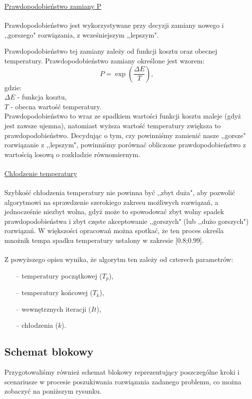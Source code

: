 \documentclass[twoside]{projektInzynierskiMS1}
\newcommand{\newLine}{~\\}
\newcommand{\si}{ś}
\begin{document}
\noindent \underline{Prawdopodobieństwo zamiany P} \\ \newLine
\indent Prawdopodobieństwo jest wykorzystywane przy decyzji zamiany nowego i ,,gorszego" rozwiązania, z wcze\si niejszym ,,lepszym". 

Prawdopodobieństwo tej zamiany zależy od funkcji kosztu oraz obecnej temperatury. Prawdopodobieństwo zamiany okre\si lone jest wzorem:
$$ P = \exp\left(\frac{\Delta E}{T}\right),  $$
gdzie:\\
$ \Delta E$  - funkcja kosztu, \\
$T$ - obecna warto\si ć temperatury.\\

Prawdopodobieństwo to wraz ze spadkiem warto\si ci funkcji kosztu maleje (gdyż jest zawsze ujemna), natomiast wyższa warto\si ć temperatury zwiększa to prawdopodobieństwo. Decydując o tym, czy powinniśmy zamienić nasze ,,gorsze" rozwiązanie z ,,lepszym", powinniśmy porównać obliczone prawdopodobieństwo z wartością losową o rozkładzie równomiernym.\\ \newLine


\noindent \underline{Chłodzenie temperatury} \\ \newLine
\indent Szybkość chłodzenia temperatury nie powinna być ,,zbyt duża", aby pozwolić algorytmowi na sprawdzenie szerokiego zakresu możliwych rozwiązań, a jednocześnie niezbyt wolna, gdyż może to spowodować zbyt wolny spadek prawdopodobieństwa i zbyt częste akceptowanie ,,gorszych" (lub ,,dużo gorszych") rozwiązań. W większości opracowań można spotkać, że ten proces okre\si la mnożnik tempa spadku temperatury ustalony w zakresie [0.8;0.99].\\ \newLine
		

Z powyższego opisu wynika, że algorytm ten zależy od czterech parametrów:
\begin{itemize}
	\item[--] temperatury początkowej ($T_p$),
	\item[--] temperatury końcowej ($T_k$),
	\item[--] wewnętrznych iteracji ($It$),
	\item[--] chłodzenia ($k$).
\end{itemize}

\subsection{Schemat blokowy}
Przygotowali\si my również schemat blokowy reprezentujący poszczególne kroki i scenariusze w procesie poszukiwania rozwiązania zadanego problemu, co można zobaczyć na poniższym rysunku.
\end{document}

